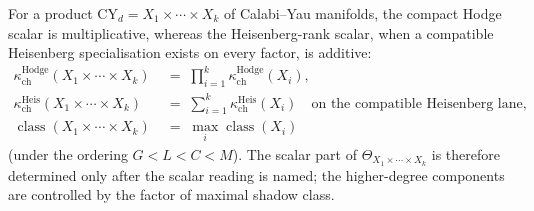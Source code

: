\begin{conjecture}
\label{conj:cy-product-shadow}
\ClaimStatusConjectured
{}
For a product $\mathrm{CY}_d = X_1 \times \cdots \times X_k$ of
Calabi--Yau manifolds, the compact Hodge scalar is multiplicative,
whereas the Heisenberg-rank scalar, when a compatible Heisenberg
specialisation exists on every factor, is additive:
\begin{align}
\kappa_{\mathrm{ch}}^{\mathrm{Hodge}}(X_1 \times \cdots \times X_k)
 &\;=\; \prod_{i=1}^k
 \kappa_{\mathrm{ch}}^{\mathrm{Hodge}}(X_i), \\
\kappa_{\mathrm{ch}}^{\mathrm{Heis}}(X_1 \times \cdots \times X_k)
 &\;=\; \sum_{i=1}^k
 \kappa_{\mathrm{ch}}^{\mathrm{Heis}}(X_i)
 \quad\text{on the compatible Heisenberg lane},\\
\operatorname{class}(X_1 \times \cdots \times X_k)
 &\;=\; \max_i \operatorname{class}(X_i)
\end{align}
\textup{(}under the ordering
$G < L < C < M$\textup{)}. The scalar part of
$\Theta_{X_1 \times \cdots \times X_k}$ is therefore determined only
after the scalar reading is named; the higher-degree components are
controlled by the factor of maximal shadow class.
\end{conjecture}

